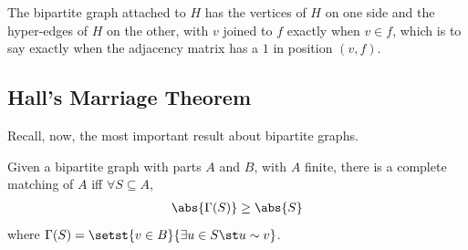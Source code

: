The bipartite graph attached to $H$ has the vertices of $H$ on one side and the hyper-edges of $H$ on the other, with $v$ joined to $f$ exactly when $v \in f$, which is to say exactly when the adjacency matrix has a $1$ in position $(v, f)$.

\subsection{Hall's Marriage Theorem}

Recall, now, the most important result about bipartite graphs.

\begin{boxtheorem} \label{Ch1:Thm:Hall}
    Given a bipartite graph with parts $A$ and $B$, with $A$ finite, there is a complete matching of $A$ iff $\forall S \subseteq A$,
    \begin{align*}
        \abs{\Gamma(S)} \geq \abs{S}
    \end{align*}
    where $\Gamma(S) = \setst{v \in B}{\exists u \in S \st u \sim v}$.
\end{boxtheorem}
